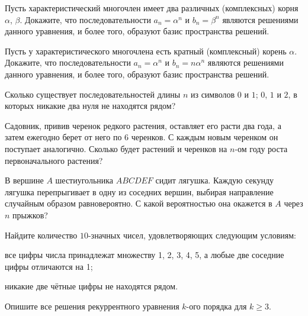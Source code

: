 \documentclass[a4paper,12pt]{article}
\begin{document}
 Пусть характеристический многочлен имеет два различных (комплексных) корня $\alpha$, $\beta$. Докажите, что последовательности $a_n = \alpha^n$ и $b_n = \beta^n$ являются решениями данного уравнения, и более того, образуют базис пространства решений.

 Пусть у характеристического  многочлена есть кратный (комплексный) корень $\alpha$. Докажите, что последовательности $a_n = \alpha^n$ и $b_n = n\alpha^n$ являются решениями данного уравнения, и более того, образуют базис пространства решений.

 Сколько существует последовательностей длины $n$ из символов  $0$ и $1$;  $0$, $1$ и $2$, в которых никакие два нуля не находятся рядом?

 Садовник, привив черенок редкого растения, оставляет его расти два года, а затем ежегодно берет от него по 6 черенков. С каждым новым черенком он поступает аналогично. Сколько будет растений и черенков на $n$-ом году роста первоначального растения?

 В вершине $A$ шестиугольника $ABCDEF$ сидит лягушка. Каждую секунду лягушка перепрыгивает в одну из соседних вершин, выбирая направление случайным образом равновероятно. С какой вероятностью она окажется в $A$ через $n$ прыжков?

 Найдите количество $10$-значных чисел, удовлетворяющих следующим условиям:

 все цифры числа принадлежат множеству 1, 2, 3, 4, 5, а любые две соседние цифры отличаются на 1;

 никакие две чётные цифры не находятся рядом.




 Опишите все решения рекуррентного уравнения $k$-ого порядка для $k \geq 3$. 

\end{document}
